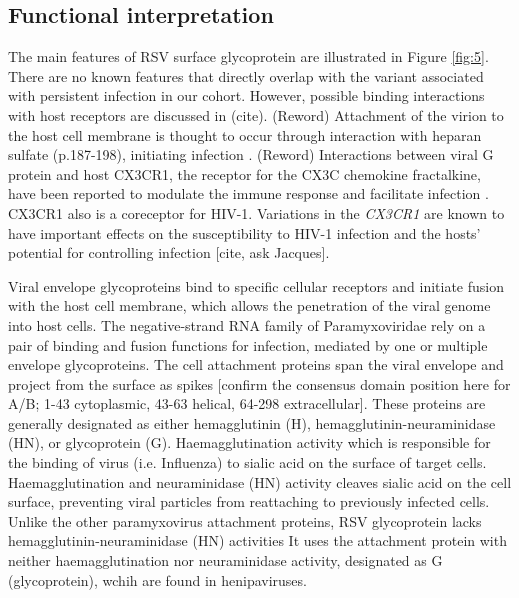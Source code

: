 \documentclass{article}
\begin{document}

\subsection{Functional interpretation}
The main features of RSV surface glycoprotein are illustrated in Figure \ref{fig:5}.
There are no known features that directly overlap with the variant associated with persistent infection in our cohort. 
However, possible binding interactions with host receptors are discussed in (cite).
(Reword) Attachment of the virion to the host cell membrane is thought to occur through interaction with heparan sulfate (p.187-198), initiating infection 
\cite{levine1987demonstration, feldman1999identification, feldman2000fusion}.
(Reword) Interactions between viral G protein and host CX3CR1, the receptor for the CX3C chemokine fractalkine, have been reported to modulate the immune response and facilitate infection 
\cite{johnson2015respiratory, tripp2001cx3c, jeong2015cx3cr1}.
CX3CR1 also is a coreceptor for HIV-1. 
Variations in the \textit{CX3CR1} are known to have important effects on the susceptibility to HIV-1 infection and the hosts' potential for controlling infection [cite, ask Jacques].

Viral envelope glycoproteins bind to specific cellular receptors and initiate fusion with the host cell membrane, 
which allows the penetration of the viral genome into host cells. 
The negative-strand RNA family of Paramyxoviridae rely on a pair of binding and fusion functions for infection, mediated by one or multiple envelope glycoproteins.
The cell attachment proteins span the viral envelope and project from the surface as spikes 
[confirm the consensus domain position here for A/B; 1-43 cytoplasmic, 43-63 helical, 64-298 extracellular].
These proteins are generally designated as either hemagglutinin (H), hemagglutinin-neuraminidase (HN), or glycoprotein (G). 
Haemagglutination activity which is responsible for the binding of virus (i.e. Influenza) to sialic acid on the surface of target cells.
Haemagglutination and neuraminidase (HN) activity cleaves sialic acid on the cell surface, preventing viral particles from reattaching to previously infected cells. 
Unlike the other paramyxovirus attachment proteins, 
RSV glycoprotein lacks hemagglutinin-neuraminidase (HN) activities
It uses the attachment protein with neither haemagglutination nor neuraminidase activity, designated as G (glycoprotein), wchih are found in henipaviruses.
\cite{takimoto2002role, malvoisin1993measles, hu1992functional, horvath1992biological, bousse1994regions}
\end{document}

